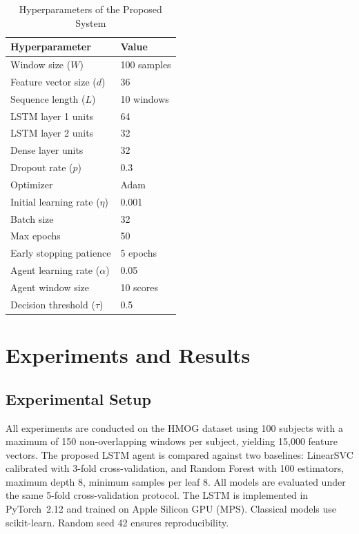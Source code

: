 \documentclass[3p,times,procedia]{elsarticle}
\begin{document}
\begin{table}[h]
\centering
\caption{Hyperparameters of the Proposed System}
\label{tab:hyperparams}
\begin{tabular}{ll}
\hline
\textbf{Hyperparameter} & \textbf{Value} \\
\hline
Window size ($W$)              & 100 samples \\
Feature vector size ($d$)      & 36          \\
Sequence length ($L$)          & 10 windows  \\
LSTM layer 1 units             & 64          \\
LSTM layer 2 units             & 32          \\
Dense layer units              & 32          \\
Dropout rate ($p$)             & 0.3         \\
Optimizer                      & Adam        \\
Initial learning rate ($\eta$) & 0.001       \\
Batch size                     & 32          \\
Max epochs                     & 50          \\
Early stopping patience        & 5 epochs    \\
Agent learning rate ($\alpha$) & 0.05        \\
Agent window size              & 10 scores   \\
Decision threshold ($\tau$)    & 0.5         \\
\hline
\end{tabular}
\end{table}


\section{Experiments and Results}
\label{sec:experiments}

\subsection{Experimental Setup}

All experiments are conducted on the HMOG dataset using 100
subjects with a maximum of 150 non-overlapping windows per
subject, yielding 15{,}000 feature vectors. The proposed LSTM
agent is compared against two baselines: LinearSVC calibrated
with 3-fold cross-validation, and Random Forest with 100
estimators, maximum depth 8, minimum samples per leaf 8.
All models are evaluated under the same 5-fold cross-validation
protocol. The LSTM is implemented in PyTorch~2.12 and trained
on Apple Silicon GPU (MPS). Classical models use scikit-learn.
Random seed 42 ensures reproducibility.
\end{document}
